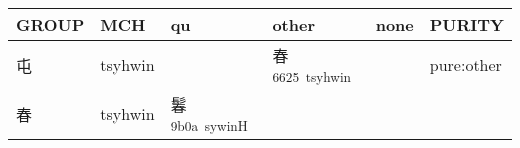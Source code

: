 \documentclass[14pt,a4paper]{scrartcl}
\begin{document}
\begin{longtable}[c]{@{}llllll@{}}
\toprule
\begin{minipage}[b]{0.14\columnwidth}\raggedright\strut
GROUP
\strut\end{minipage} &
\begin{minipage}[b]{0.14\columnwidth}\raggedright\strut
MCH
\strut\end{minipage} &
\begin{minipage}[b]{0.14\columnwidth}\raggedright\strut
qu
\strut\end{minipage} &
\begin{minipage}[b]{0.14\columnwidth}\raggedright\strut
other
\strut\end{minipage} &
\begin{minipage}[b]{0.14\columnwidth}\raggedright\strut
none
\strut\end{minipage} &
\begin{minipage}[b]{0.14\columnwidth}\raggedright\strut
PURITY
\strut\end{minipage}\tabularnewline
\midrule
\endhead
\begin{minipage}[t]{0.14\columnwidth}\raggedright\strut
屯
\strut\end{minipage} &
\begin{minipage}[t]{0.14\columnwidth}\raggedright\strut
tsyhwin
\strut\end{minipage} &
\begin{minipage}[t]{0.14\columnwidth}\raggedright\strut
\strut\end{minipage} &
\begin{minipage}[t]{0.14\columnwidth}\raggedright\strut
春\textsuperscript{6625~tsyhwin}
\strut\end{minipage} &
\begin{minipage}[t]{0.14\columnwidth}\raggedright\strut
\strut\end{minipage} &
\begin{minipage}[t]{0.14\columnwidth}\raggedright\strut
pure:other
\strut\end{minipage}\tabularnewline
\begin{minipage}[t]{0.14\columnwidth}\raggedright\strut
春
\strut\end{minipage} &
\begin{minipage}[t]{0.14\columnwidth}\raggedright\strut
tsyhwin
\strut\end{minipage} &
\begin{minipage}[t]{0.14\columnwidth}\raggedright\strut
鬊\textsuperscript{9b0a~sywinH}
\strut\end{minipage} &

\end{longtable}
\end{document}
